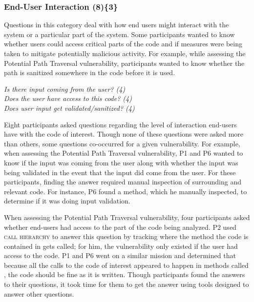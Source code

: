 \documentclass{acm_proc_article-sp}
\begin{document}



\subsubsection{\textbf{End-User Interaction (8)\{3\}}}
\label{eui}

Questions in this category deal with how end users might interact with the system or a particular part of the system. 
Some participants wanted to know whether users could access critical parts of the code and if measures were being taken to mitigate potentially malicious activity. 
For example, while assessing the Potential Path Traversal vulnerability, participants wanted to know whether the path is sanitized somewhere in the code before it is used.


\noindent\emph{Is there input coming from the user? (4)} \\
\emph{Does the user have access to this code? (4)} \\
\emph{Does user input get validated/sanitized? (4)} 


 
Eight participants asked questions regarding the level of interaction end-users have with the code of interest. 
Though none of these questions were asked more than others, some questions co-occurred for a given vulnerability.
For example, when assessing the Potential Path Traversal vulnerability, P1 and P6 wanted to know if the input was coming from the user along with whether the input was being validated in the event that the input did come from the user.
For these participants, finding the answer required manual inspection of surrounding and relevant code. 
For instance, P6 found a  method, which he manually inspected, to determine if it was doing input validation.

When assessing the Potential Path Traversal vulnerability, four participants asked whether end-users had access to the part of the code being analyzed.
P2 used \textsc{call hierarchy} to answer this question by tracking where the method the code is contained in gets called; for him, the vulnerability only existed if the user had access to the code.
P1 and P6 went on a similar mission and determined that because all the calls to the code of interest appeared to happen in methods called , the code should be fine as it is written.
Though participants found the answers to their questions, it took time for them to get the answer using tools designed to answer other questions.
\end{document}
